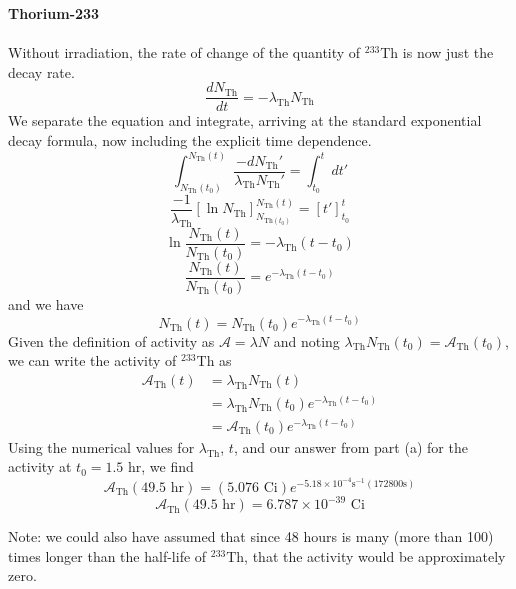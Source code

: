 \documentclass{report}
\begin{document}
\textbf{Thorium-233}\\
\-\\
Without irradiation, the rate of change of the quantity of $^{233}$Th is now just the decay rate. 
$$ \frac{dN_{\text{Th}}}{dt} = -\lambda_{\text{Th}}N_{\text{Th}} $$
We separate the equation and integrate, arriving at the standard exponential decay formula, now including the explicit time dependence.
$$ \int_{N_{\text{Th}}(t_0)}^{N_{\text{Th}}(t)} \frac{-dN_{\text{Th}}'}{\lambda_{\text{Th}}N_{\text{Th}}'} = \int_{t_0}^{t} dt' $$
$$ \frac{-1}{\lambda_{\text{Th}}}\left[ \ln{N_{\text{Th}}} \right]_{N_{\text{Th}(t_0)}}^{N_{\text{Th}}(t)} = \left[t'\right]_{t_0}^{t} $$
$$ \ln\frac{N_{\text{Th}}(t)}{N_{\text{Th}}(t_0)}  = -\lambda_{\text{Th}}(t-t_0) $$
$$ \frac{N_{\text{Th}}(t)}{N_{\text{Th}}(t_0)}  = e^{-\lambda_{\text{Th}}(t-t_0)} $$
and we have 
$$ N_{\text{Th}}(t) = N_{\text{Th}}(t_0) e^{-\lambda_{\text{Th}}\left(t-t_0\right)} $$
Given the definition of activity as $\mathcal{A} = \lambda N$ and noting $\lambda_{\text{Th}} N_{\text{Th}}(t_0) = \mathcal{A}_{\text{Th}}(t_0)$, we can write the activity of $^{233}$Th as
\begin{align*}
\mathcal{A}_{\text{Th}}(t)	&= \lambda_{\text{Th}} N_{\text{Th}}(t) \\
							&= \lambda_{\text{Th}} N_{\text{Th}}(t_0) e^{-\lambda_{\text{Th}}(t-t_0)} \\ 
							&= \mathcal{A}_{\text{Th}}(t_0) e^{-\lambda_{\text{Th}}(t-t_0)}
\end{align*}
Using the numerical values for $\lambda_{\text{Th}}$, $t$, and our answer from part (a) for the activity at $t_0=1.5$ hr, we find
$$ \mathcal{A}_{\text{Th}}(49.5\text{ hr}) = (5.076 \text{ Ci})e^{-5.18\times10^{-4}\text{s}^{-1} (172800\text{s})} $$
$$ \boxed{\mathcal{A}_{\text{Th}}(49.5\text{ hr}) = 6.787\times10^{-39}\text{ Ci}} $$

{\small Note: we could also have assumed that since 48 hours is many (more than 100) times longer than the half-life of $^{233}$Th, that the activity would be approximately zero.}
\-\\
\-\\
\end{document}
